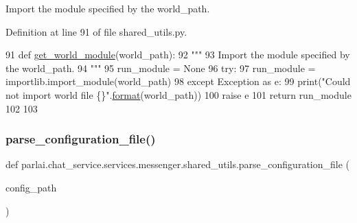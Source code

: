 \begin{DoxyVerb}Import the module specified by the world_path.
\end{DoxyVerb}
 

Definition at line 91 of file shared\+\_\+utils.\+py.


\begin{DoxyCode}
91 \textcolor{keyword}{def }\hyperlink{namespaceparlai_1_1chat__service_1_1services_1_1messenger_1_1shared__utils_a6285f6c110c5c6fc4ab5d33aaac628f3}{get\_world\_module}(world\_path):
92     \textcolor{stringliteral}{"""}
93 \textcolor{stringliteral}{    Import the module specified by the world\_path.}
94 \textcolor{stringliteral}{    """}
95     run\_module = \textcolor{keywordtype}{None}
96     \textcolor{keywordflow}{try}:
97         run\_module = importlib.import\_module(world\_path)
98     \textcolor{keywordflow}{except} Exception \textcolor{keyword}{as} e:
99         print(\textcolor{stringliteral}{"Could not import world file \{\}"}.\hyperlink{namespaceparlai_1_1mturk_1_1core_1_1shared__utils_afcac728e96b38bbad8cde6f7be4f613e}{format}(world\_path))
100         \textcolor{keywordflow}{raise} e
101     \textcolor{keywordflow}{return} run\_module
102 
103 
\end{DoxyCode}
\mbox{\label{namespaceparlai_1_1chat__service_1_1services_1_1messenger_1_1shared__utils_a81d665344fc48303d4cc4cf8fe48066e}} 
\subsubsection{\texorpdfstring{parse\+\_\+configuration\+\_\+file()}{parse\_configuration\_file()}}
{\footnotesize\ttfamily def parlai.\+chat\+\_\+service.\+services.\+messenger.\+shared\+\_\+utils.\+parse\+\_\+configuration\+\_\+file (\begin{DoxyParamCaption}\item[{}]{config\+\_\+path }\end{DoxyParamCaption})}

